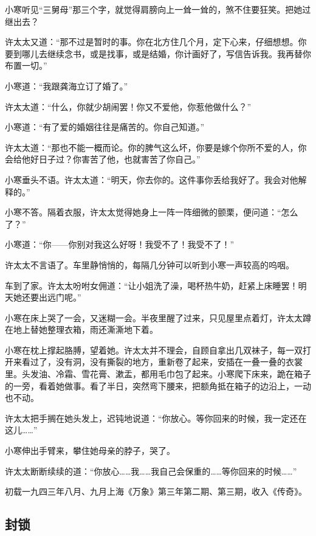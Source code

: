 \par 小寒听见“三舅母”那三个字，就觉得肩膀向上一耸一耸的，煞不住要狂笑。把她过继出去？
\par 许太太又道：“那不过是暂时的事。你在北方住几个月，定下心来，仔细想想。你要到哪儿去继续念书，或是找事，或是结婚，你计画好了，写信告诉我。我再替你布置一切。”
\par 小寒道：“我跟龚海立订了婚了。”
\par 许太太道：“什么，你就少胡闹罢！你又不爱他，你惹他做什么？”
\par 小寒道：“有了爱的婚姻往往是痛苦的。你自己知道。”
\par 许太太道：“那也不能一概而论。你的脾气这么坏，你要是嫁个你所不爱的人，你会给他好日子过？你害苦了他，也就害苦了你自己。”
\par 小寒垂头不语。许太太道：“明天，你去你的。这件事你丢给我好了。我会对他解释的。”
\par 小寒不答。隔着衣服，许太太觉得她身上一阵一阵细微的颤栗，便问道：“怎么了？”
\par 小寒道：“你——你别对我这么好呀！我受不了！我受不了！”
\par 许太太不言语了。车里静悄悄的，每隔几分钟可以听到小寒一声较高的呜咽。
\par 车到了家。许太太吩咐女佣道：“让小姐洗了澡，喝杯热牛奶，赶紧上床睡罢！明天她还要出远门呢。”
\par 小寒在床上哭了一会，又迷糊一会。半夜里醒了过来，只见屋里点着灯，许太太蹲在地上替她整理衣箱，雨还澌澌地下着。
\par 小寒在枕上撑起胳膊，望着她。许太太并不理会，自顾自拿出几双袜子，每一双打开来看过了，没有洞，没有撕裂的地方，重新卷了起来，安插在一叠一叠的衣裳里。头发油、冷霜、雪花膏、漱盂，都用毛巾包了起来。小寒爬下床来，跪在箱子的一旁，看着她做事。看了半日，突然弯下腰来，把额角抵在箱子的边沿上，一动也不动。
\par 许太太把手搁在她头发上，迟钝地说道：“你放心。等你回来的时候，我一定还在这儿……”
\par 小寒伸出手臂来，攀住她母亲的脖子，哭了。
\par 许太太断断续续的道：“你放心……我……我自己会保重的……等你回来的时候……”
\par {}
\par *初载一九四三年八月、九月上海《万象》第三年第二期、第三期，收入《传奇》。


\subsection{封锁}

